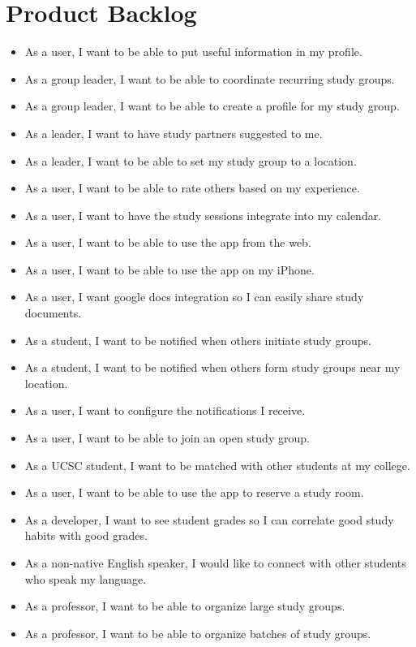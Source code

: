 \documentclass[10pt]{article}
\begin{document}
    \section{Product Backlog}
    \begin{itemize}
        \item As a user, I want to be able to put useful information in my profile.
        \item As a group leader, I want to be able to coordinate recurring study groups.
        \item As a group leader, I want to be able to create a profile for my study group.
        \item As a leader, I want to have study partners suggested to me.
        \item As a leader, I want to be able to set my study group to a location.
        \item As a user, I want to be able to rate others based on my experience.
        \item As a user, I want to have the study sessions integrate into my calendar.
        \item As a user, I want to be able to use the app from the web.
        \item As a user, I want to be able to use the app on my iPhone.
        \item As a user, I want google docs integration so I can easily share study documents.
        \item As a student, I want to be notified when others initiate study groups.
        \item As a student, I want to be notified when others form study groups near my location.
        \item As a user, I want to configure the notifications I receive.
        \item As a user, I want to be able to join an open study group.
        \item As a UCSC student, I want to be matched with other students at my college.
        \item As a user, I want to be able to use the app to reserve a study room.
        \item As a developer, I want to see student grades so I can correlate good study habits with good grades.
        \item As a non-native English speaker, I would like to connect with other students who speak my language.
        \item As a professor, I want to be able to organize large study groups.
        \item As a professor, I want to be able to organize batches of study groups.
    \end{itemize}    
\end{document}

